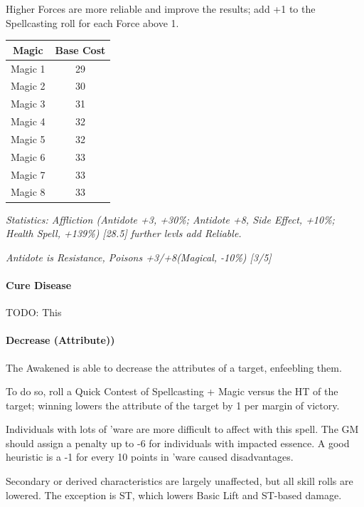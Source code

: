 \begin{multicols*}{3}
	Higher Forces are more reliable and improve the results; add +1 to the Spellcasting roll for each Force above 1.
	
	\begin{center}
		\begin{tabular}{|c|c|}
			\hline
			Magic & Base Cost \\
			\hline
			\hline
			Magic 1 & 29 \\
			Magic 2 & 30 \\
			Magic 3 & 31 \\
			Magic 4 & 32 \\
			Magic 5 & 32 \\
			Magic 6 & 33 \\
			Magic 7 & 33 \\
			Magic 8 & 33 \\
			\hline
		\end{tabular}
	\end{center}
	
	\textcolor{OliveGreen}{\textit{Statistics: Affliction (Antidote +3, +30\%; Antidote +8, Side Effect, +10\%; Health Spell, +139\%) [28.5] further levls add Reliable. }}
	
	\textcolor{OliveGreen}{\textit{Antidote is Resistance, Poisons +3/+8(Magical, -10\%) [3/5] }}
	
	\paragraph{Cure Disease}
	
	TODO: This
	
	\paragraph{Decrease (Attribute))}
	
	The Awakened is able to decrease the attributes of a target, enfeebling them.
	
	To do so, roll a Quick Contest of Spellcasting + Magic versus the HT of the target; winning lowers the attribute of the target by 1 per margin of victory.	
	
	Individuals with lots of 'ware are more difficult to affect with this spell. The GM should assign a penalty up to -6 for individuals with impacted essence. A good heuristic is a -1 for every 10 points in 'ware caused disadvantages.
	
	Secondary or derived characteristics are largely unaffected, but all skill rolls are lowered. The exception is ST, which lowers Basic Lift and ST-based damage.
	

\end{multicols*}

